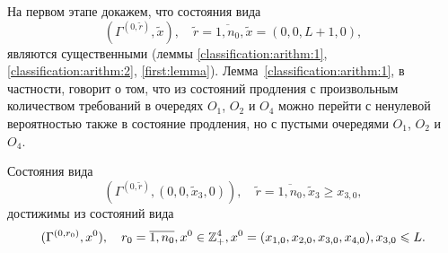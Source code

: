 На первом этапе докажем,  что состояния вида 
$$(\Gamma^{(0,  \tilde{r})},  \tilde{x}),  \quad \tilde{r} = \overline{1,  n_0},  \tilde{x}=(0,  0,  L+1,  0), $$ 
являются существенными (леммы \ref{classification:arithm:1},  \ref{classification:arithm:2},  \ref{first:lemma}). Лемма~\ref{classification:arithm:1},  в частности,  говорит о том,  что из состояний продления с произвольным количеством требований в очередях $O_1$,  $O_2$ и $O_4$ можно перейти с ненулевой вероятностью также в состояние продления,  но с пустыми очередями $O_1$,  $O_2$ и $O_4$.

\begin{lemma}
Состояния вида 
$$(\Gamma^{(0,  \tilde{r})}, (0,  0,  \tilde{x}_3,  0)),  \quad \tilde{r} = \overline{1,  n_0},  \tilde{x}_3 \geqslant x_{3,  0}, $$
достижимы из состояний вида 
$$(\Gamma^{(0,  r_0)},  x^0),  \quad r_0=\overline{1,  n_0},  x^0 \hm\in \mathbb{Z}_+^4,  x^0\hm=(x_{1, 0},  x_{2, 0},  x_{3, 0},  x_{4, 0}),  x_{3,  0} \leqslant L.$$
\label{classification:arithm:1}
\end{lemma}
